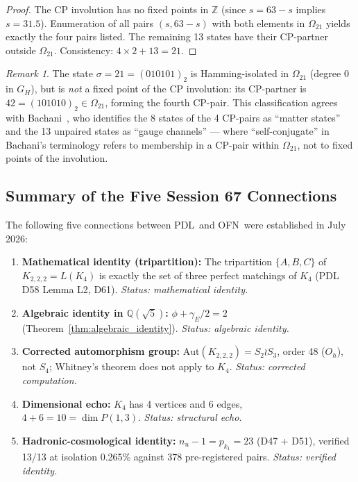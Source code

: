 \documentclass[11pt,a4paper]{article}
\theoremstyle{plain}
\theoremstyle{definition}
\theoremstyle{remark}
\newtheorem{remark}[theorem]{Remark}
\newcommand{\PDL}{\textnormal{PDL}}
\newcommand{\OFN}{\textnormal{OFN}}
\begin{document}
\begin{proof}
The CP involution has no fixed points in $\mathbb{Z}$ (since $s = 63-s$ implies $s = 31.5$). Enumeration of all pairs $(s, 63-s)$ with both elements in $\Omega_{21}$ yields exactly the four pairs listed. The remaining 13 states have their CP-partner outside $\Omega_{21}$. Consistency: $4 \times 2 + 13 = 21$.
\end{proof}

\begin{remark}
The state $\sigma = 21 = (010101)_2$ is Hamming-isolated in $\Omega_{21}$ (degree 0 in $G_H$), but is \textit{not} a fixed point of the CP involution: its CP-partner is $42 = (101010)_2 \in \Omega_{21}$, forming the fourth CP-pair. This classification agrees with Bachani~\cite{Bachani2026}, who identifies the 8 states of the 4 CP-pairs as ``matter states'' and the 13 unpaired states as ``gauge channels'' --- where ``self-conjugate'' in Bachani's terminology refers to membership in a CP-pair within $\Omega_{21}$, not to fixed points of the involution.
\end{remark}

\subsection{Summary of the Five Session 67 Connections}
\label{sec:session67_summary}

The following five connections between \PDL\ and \OFN\ were established in July 2026:

\begin{enumerate}
    \item \textbf{Mathematical identity (tripartition):} The tripartition $\{A, B, C\}$ of $K_{2,2,2} = L(K_4)$ is exactly the set of three perfect matchings of $K_4$ (PDL D58 Lemma L2, D61). \textit{Status: mathematical identity.}
    \item \textbf{Algebraic identity in $\mathbb{Q}(\sqrt{5})$:} $\phi + \gamma_E/2 = 2$ (Theorem~\ref{thm:algebraic_identity}). \textit{Status: algebraic identity.}
    \item \textbf{Corrected automorphism group:} $\mathrm{Aut}(K_{2,2,2}) = S_2 \wr S_3$, order 48 ($O_h$), not $S_4$; Whitney's theorem does not apply to $K_4$. \textit{Status: corrected computation.}
    \item \textbf{Dimensional echo:} $K_4$ has 4 vertices and 6 edges, $4 + 6 = 10 = \dim P(1,3)$. \textit{Status: structural echo.}
    \item \textbf{Hadronic-cosmological identity:} $n_u - 1 = p_{k_1} = 23$ (D47 + D51), verified 13/13 at isolation 0.265\% against 378 pre-registered pairs. \textit{Status: verified identity.}
\end{enumerate}
\end{document}
